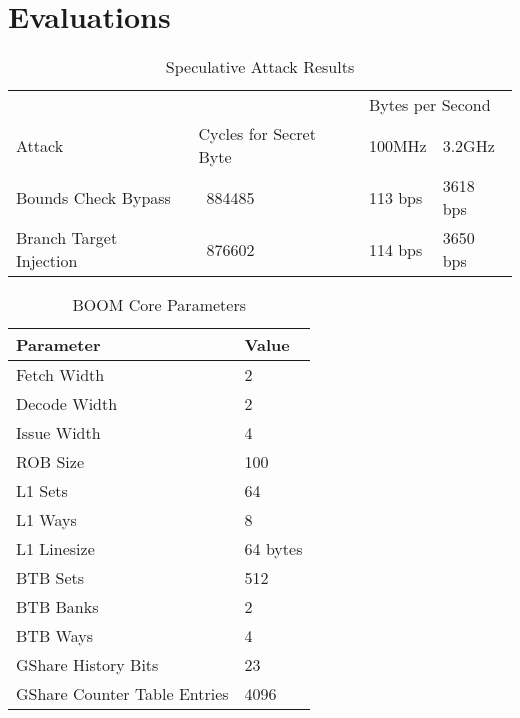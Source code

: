 \section{Evaluations}

\begin{table}
\centering
\caption{Speculative Attack Results}
\label{tab:spec-attack-results}
\begin{tabular}{@{} *4l @{}} \toprule
    &                        & \multicolumn{2}{l}{Bytes per Second} \\
    Attack                  & Cycles for Secret Byte &           100MHz &   3.2GHz \\ \midrule
    Bounds Check Bypass     &                ~884485 &          113 bps & 3618 bps \\
    Branch Target Injection &                ~876602 &          114 bps & 3650 bps \\ \bottomrule
\end{tabular}
\end{table}

\begin{table}
\centering
\caption{BOOM Core Parameters}
\label{tab:boom-core-params}
\begin{tabular}{@{} *2l @{}} \toprule
    Parameter                    & Value \\ \midrule
    Fetch Width                  & 2 \\
    Decode Width                 & 2 \\
    Issue Width                  & 4 \\
    ROB Size                     & 100 \\ \midrule
    L1 Sets                      & 64 \\
    L1 Ways                      & 8 \\
    L1 Linesize                  & 64 bytes \\ \midrule
    BTB Sets                     & 512 \\
    BTB Banks                    & 2 \\
    BTB Ways                     & 4 \\ \midrule
    GShare History Bits          & 23 \\
    GShare Counter Table Entries & 4096 \\ \bottomrule
\end{tabular}
\end{table}

